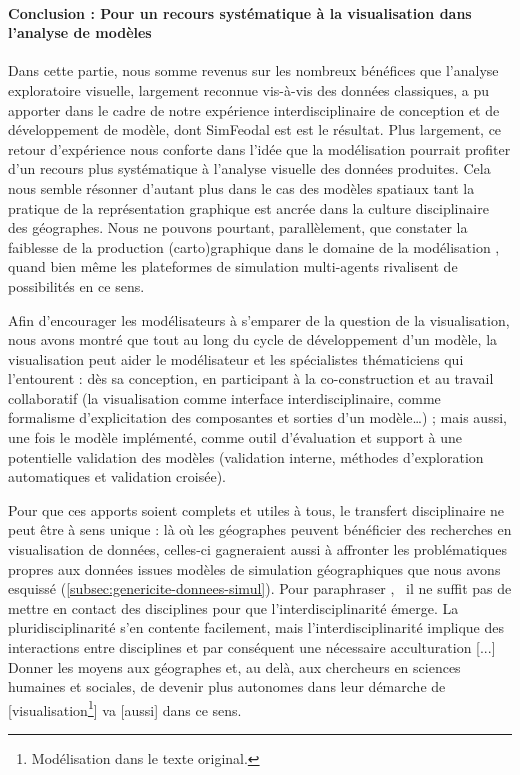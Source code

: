 \paragraph{Conclusion : Pour un recours systématique à la visualisation dans l'analyse de modèles}
Dans cette partie, nous somme revenus sur les nombreux bénéfices que l'analyse exploratoire visuelle, largement reconnue vis-à-vis des données classiques, a pu apporter dans le cadre de notre expérience interdisciplinaire de conception et de développement de modèle, dont SimFeodal est est le résultat.
Plus largement, ce retour d'expérience nous conforte dans l'idée que la modélisation pourrait profiter d'un recours plus systématique à l'analyse visuelle des données produites.
Cela nous semble résonner d'autant plus dans le cas des modèles spatiaux tant la pratique de la représentation graphique est ancrée dans la culture disciplinaire des géographes.
Nous ne pouvons pourtant, parallèlement, que constater la faiblesse de la production (carto)graphique dans le domaine de la modélisation \autocite[introduction, \ppno~N--N+2]{cura_visualisation_2020}, quand bien même les plateformes de simulation multi-agents rivalisent de possibilités en ce sens.

\noindent Afin d’encourager les modélisateurs à s’emparer de la question de la visualisation, nous avons montré que tout au long du cycle de développement d'un modèle, la visualisation peut aider le modélisateur et les spécialistes thématiciens qui l’entourent  :
dès sa conception, en participant à la co-construction et au travail collaboratif (la visualisation comme interface interdisciplinaire, comme formalisme d'explicitation des composantes et sorties d'un modèle\ldots) ;
mais aussi, une fois le modèle implémenté, comme outil d'évaluation et support à une potentielle validation des modèles (validation interne, méthodes d'exploration automatiques et validation croisée).

\noindent Pour que ces apports soient complets et utiles à tous, le transfert disciplinaire ne peut être à sens unique : là où les géographes peuvent bénéficier des recherches en visualisation de données, celles-ci gagneraient aussi à affronter les problématiques propres aux données issues modèles de simulation géographiques que nous avons esquissé (\cref{subsec:genericite-donnees-simul}).
Pour paraphraser \textcite[76]{banos_pour_2013}, \og il ne suffit pas de mettre en contact des disciplines pour que l’interdisciplinarité émerge.
La pluridisciplinarité s’en contente facilement, mais l’interdisciplinarité implique des interactions entre disciplines et par conséquent une nécessaire acculturation [...]
Donner les moyens aux géographes et, au delà, aux chercheurs en sciences humaines et sociales, de devenir plus autonomes dans leur démarche de [visualisation\footnote{
	\og Modélisation\fg{} dans le texte original.
}] va [aussi] dans ce sens\fg{}.


